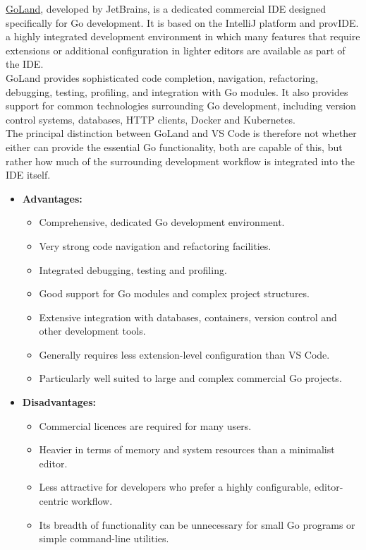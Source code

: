\href{https://www.jetbrains.com/go/}{GoLand}, developed by JetBrains, is a dedicated commercial IDE designed specifically for Go development. It is based on the IntelliJ platform and provIDE. a highly integrated development environment in which many features that require extensions or additional configuration in lighter editors are available as part of the IDE.\\

GoLand provides sophisticated code completion, navigation, refactoring, debugging, testing, profiling, and integration with Go modules. It also provides support for common technologies surrounding Go development, including version control systems, databases, HTTP clients, Docker and Kubernetes.\\

The principal distinction between GoLand and VS Code is therefore not whether either can provide the essential Go functionality, both are capable of this, but rather how much of the surrounding development workflow is integrated into the IDE itself.

\begin{itemize}
\item \textbf{Advantages:}
\begin{itemize}
\item Comprehensive, dedicated Go development environment.
\item Very strong code navigation and refactoring facilities.
\item Integrated debugging, testing and profiling.
\item Good support for Go modules and complex project structures.
\item Extensive integration with databases, containers, version control and other development tools.
\item Generally requires less extension-level configuration than VS Code.
\item Particularly well suited to large and complex commercial Go projects.
\end{itemize}

\item \textbf{Disadvantages:}
\begin{itemize}
    \item Commercial licences are required for many users.
    \item Heavier in terms of memory and system resources than a minimalist editor.
    \item Less attractive for developers who prefer a highly configurable, editor-centric workflow.
    \item Its breadth of functionality can be unnecessary for small Go programs or simple command-line utilities.
\end{itemize}

\end{itemize}

